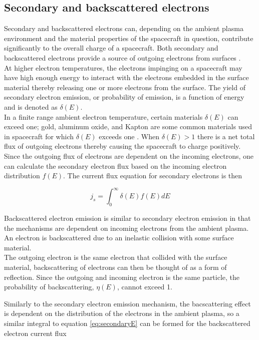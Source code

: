 \subsection*{Secondary and backscattered electrons}
Secondary and backscattered electrons can, depending on the ambient plasma environment and the material properties of the spacecraft in question, contribute significantly to the overall charge of a spacecraft. Both secondary and backscattered electrons provide a source of outgoing electrons from surfaces . 
\\
At higher electron temperatures, the electrons impinging on a spacecraft may have high enough energy to interact with the electrons embedded in the surface material thereby releasing one or more electrons from the surface. The yield of secondary electron emission, or probability of emission, is a function of energy and is denoted as $\delta(E)$. 
\\
In a finite range ambient electron temperature, certain materials $\delta(E)$ can exceed one; gold, aluminum oxide, and Kapton are some common materials used in spacecraft for which $\delta(E)$ exceeds one . When $\delta(E) > 1$ there is a net total flux of outgoing electrons thereby causing the spacecraft to charge positively.  
\\
Since the outgoing flux of electrons are dependent on the incoming electrons, one can calculate the secondary electron flux based on the incoming electron distribution $f(E)$. The current flux equation for secondary electrons is then

\begin{equation}\label{eq:secondaryE}
    j_s = \int^{\infty}_0 \delta(E) f(E) dE
\end{equation}


Backscattered electron emission is similar to secondary electron emission in that the mechanisms are dependent on incoming electrons from the ambient plasma. An electron is backscattered due to an inelastic collision with some surface material. 
\\
The outgoing electron is the same electron that collided with the surface material, backscattering of electrons can then be thought of as a form of reflection. Since the outgoing and incoming electron is the same particle, the probability of backscattering, $\eta(E)$, cannot exceed 1. 

Similarly to the secondary electron emission mechanism, the bacscattering effect is dependent on the distribution of the electrons in the ambient plasma, so a similar integral to equation \ref{eq:secondaryE} can be formed for the backscattered electron current flux 

